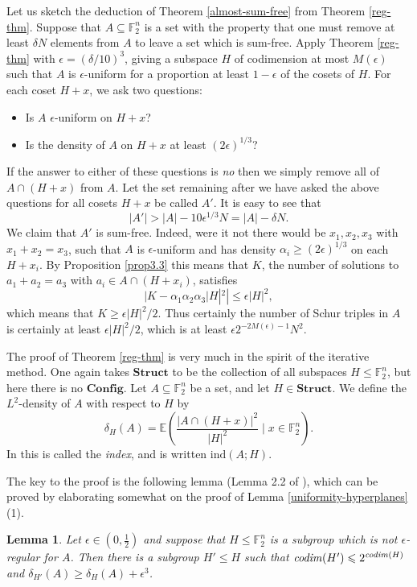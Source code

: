 \documentclass[12pt,a4paper,reqno]{amsart}
\numberwithin{equation}{section}
\theoremstyle{plain}
\newtheorem{lemma}[subsection]{Lemma}
\theoremstyle{definition}
\renewcommand{\leq}{\leqslant}
\renewcommand{\geq}{\geqslant}
\def\ind{\mbox{ind}}
\begin{document}
\noindent Let us sketch the deduction of Theorem \ref{almost-sum-free} from Theorem \ref{reg-thm}. Suppose that $A \subseteq \mathbb{F}_2^n$ is a set with the property that one must remove at least $\delta N$ elements from $A$ to leave a set which is sum-free. Apply Theorem \ref{reg-thm} with $\epsilon = (\delta/10)^3$, giving a subspace $H$ of codimension at most $M(\epsilon)$ such that $A$ is $\epsilon$-uniform for a proportion at least $1 - \epsilon$ of the cosets of $H$. For each coset $H + x$, we ask two questions:
\begin{itemize}
\item Is $A$ $\epsilon$-uniform on $H + x$?
\item Is the density of $A$ on $H + x$ at least $(2\epsilon)^{1/3}$?
\end{itemize}
If the answer to either of these questions is \textit{no} then we simply remove all of $A \cap (H + x)$ from $A$. Let the set remaining after we have asked the above questions for all cosets $H + x$ be called $A'$. It is easy to see that \[ |A'| > |A| - 10 \epsilon^{1/3} N = |A| - \delta N.\]
We claim that $A'$ is sum-free. Indeed, were it not there would be $x_1,x_2,x_3$ with $x_1 + x_2 = x_3$, such that $A$ is $\epsilon$-uniform and has density $\alpha_i \geq (2\epsilon)^{1/3}$ on each $H + x_i$. By Proposition \ref{prop3.3} this means that $K$, the number of solutions to $a_1 + a_2 = a_3$ with $a_i \in A \cap (H+ x_i)$, satisfies
\[ |K - \alpha_1 \alpha_2 \alpha_3 |H|^2| \leq \epsilon |H|^2,\]
which means that $K \geq \epsilon |H|^2/2$. Thus certainly the number of Schur triples in $A$ is certainly at least $\epsilon |H|^2/2$, which is at least $\epsilon 2^{-2 M(\epsilon) - 1} N^2$. \vspace{11pt}

\noindent The proof of Theorem \ref{reg-thm} is very much in the spirit of the iterative method. One again takes $\mathbf{Struct}$ to be the collection of all subspaces $H \leq \mathbb{F}_2^n$, but here there is no $\mathbf{Config}$. Let $A \subseteq \mathbb{F}_2^n$ be a set, and let $H \in \mathbf{Struct}$. We define the $L^2$-density of $A$ with respect to $H$ by
\[ \delta_H(A) = \mathbb{E}(\frac{|A \cap (H + x)|^2}{|H|^2} \; | \; x \in \mathbb{F}_2^n).\]
In \cite{green-reg} this is called the \textit{index}, and is written $\ind(A;H)$.\vspace{11pt}

\noindent The key to the proof is the following lemma (Lemma 2.2 of \cite{green-reg}), which can be proved by elaborating somewhat on the proof of Lemma \ref{uniformity-hyperplanes} (1).
\begin{lemma}\label{lem2.2} Let $\epsilon \in (0,\frac{1}{2})$ and
suppose that $H \leq \mathbb{F}_2^n$ is a subgroup which is not $\epsilon$-regular for $A$. Then there is a subgroup $H' \leq H$ such that $\mbox{\emph{codim}}(H') \leq 2^{\mbox{\emph{\scriptsize codim}}(H)}$ and $\delta_{H'}(A) \geq \delta_H(A) + \epsilon^3$.
\end{lemma}
\end{document}
